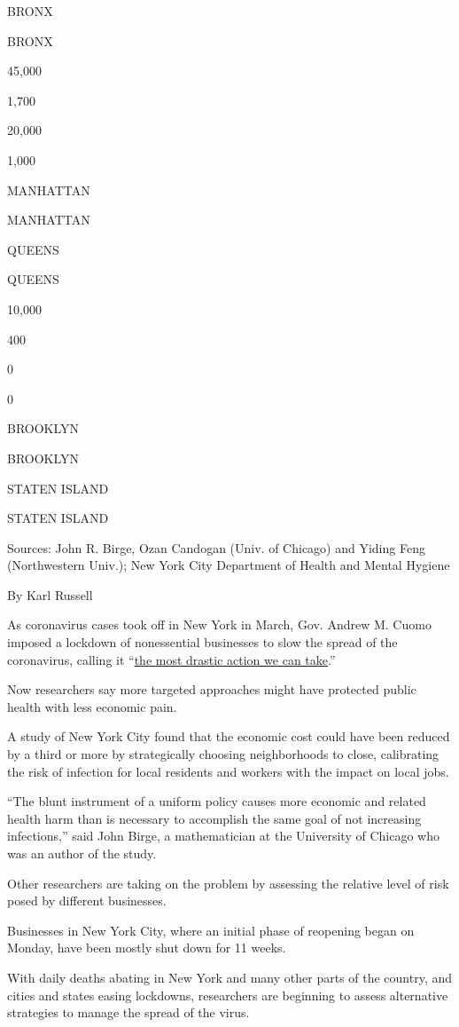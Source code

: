 BRONX

BRONX

45,000

1,700

20,000

1,000

MANHATTAN

MANHATTAN

QUEENS

QUEENS

10,000

400

0

0

BROOKLYN

BROOKLYN

STATEN ISLAND

STATEN ISLAND

Sources: John R. Birge, Ozan Candogan (Univ. of Chicago) and Yiding Feng
(Northwestern Univ.); New York City Department of Health and Mental
Hygiene

By Karl Russell

As coronavirus cases took off in New York in March, Gov. Andrew M. Cuomo
imposed a lockdown of nonessential businesses to slow the spread of the
coronavirus, calling it
``\href{https://www.nytimes3xbfgragh.onion/2020/03/20/us/ny-ca-stay-home-order.html}{the
most drastic action we can take}.''

Now researchers say more targeted approaches might have protected public
health with less economic pain.

A study of New York City found that the economic cost could have been
reduced by a third or more by strategically choosing neighborhoods to
close, calibrating the risk of infection for local residents and workers
with the impact on local jobs.

``The blunt instrument of a uniform policy causes more economic and
related health harm than is necessary to accomplish the same goal of not
increasing infections,'' said John Birge, a mathematician at the
University of Chicago who was an author of the study.

Other researchers are taking on the problem by assessing the relative
level of risk posed by different businesses.

Businesses in New York City, where an initial phase of reopening began
on Monday, have been mostly shut down for 11 weeks.

With daily deaths abating in New York and many other parts of the
country, and cities and states easing lockdowns, researchers are
beginning to assess alternative strategies to manage the spread of the
virus.

